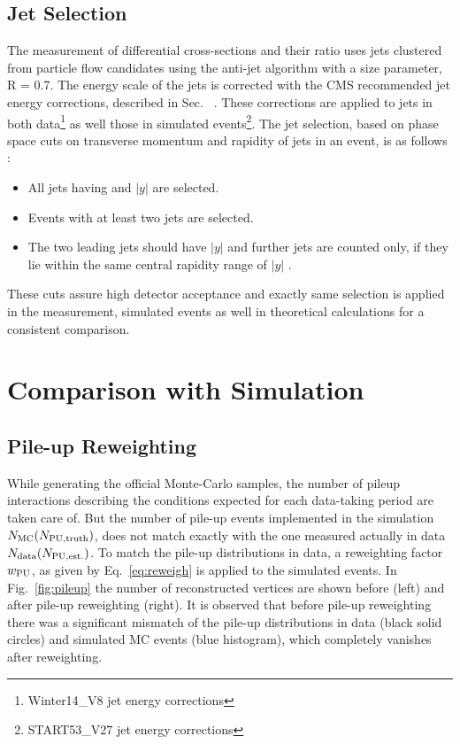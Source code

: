 \subsection{Jet Selection}
The measurement of differential cross-sections and their ratio uses jets clustered from particle flow candidates using the anti-\kt jet algorithm with a size parameter, R = 0.7. The energy scale of the jets is corrected with the CMS recommended jet energy corrections, described in Sec. \qm~. These corrections are applied to jets in both data\footnote{Winter14\_V8 jet energy corrections} as well those in simulated events\footnote{START53\_V27 jet energy corrections}. The jet selection, based on phase space cuts on transverse momentum and rapidity of jets in an event, is as follows : 

\begin{itemize}
\item All jets having \pt {} \GeV and $|y|$  are selected.
\item Events with at least two jets are selected.
\item The two leading jets should have $|y|$  and further jets are counted only, if they lie within the same central rapidity range of $|y|$ . 
\end{itemize}
These cuts assure high detector acceptance and exactly same selection is applied in the measurement, simulated events as well in theoretical calculations for a consistent comparison. 

\section{Comparison with Simulation}
\subsection{Pile-up Reweighting}
While generating the official Monte-Carlo samples, the number of pileup interactions describing the conditions expected for each data-taking period are taken care of. But the number of pile-up events implemented in the simulation $N_{\rm MC} (N_{\rm PU,truth})$, does not match exactly with the one measured actually in data $N_{\rm data} (N_{\rm PU,est.})$. To match the pile-up distributions in data, a reweighting factor $w_{\rm PU}$, as given by Eq.~\ref{eq:reweigh} is applied to the simulated events. In Fig.~\ref{fig:pileup} the number of reconstructed vertices are shown before (left) and after pile-up reweighting (right). It is observed that before pile-up reweighting there was a significant mismatch of the pile-up distributions in data (black solid circles) and simulated MC events (blue histogram), which completely vanishes after reweighting. 

